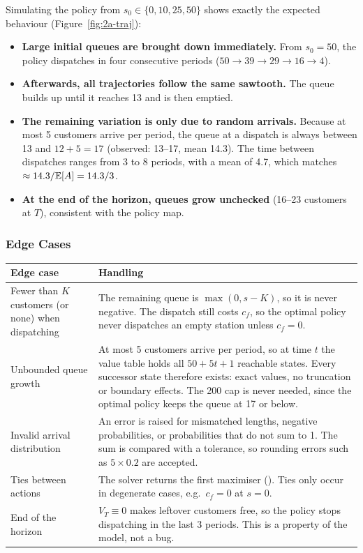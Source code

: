 Simulating the policy from $s_0 \in \{0, 10, 25, 50\}$ shows exactly the expected behaviour (Figure~\ref{fig:2a-traj}):
\begin{itemize}
  \item \textbf{Large initial queues are brought down immediately.} From $s_0 = 50$, the policy dispatches in four consecutive periods ($50 \to 39 \to 29 \to 16 \to 4$).
  \item \textbf{Afterwards, all trajectories follow the same sawtooth.} The queue builds up until it reaches 13 and is then emptied.
  \item \textbf{The remaining variation is only due to random arrivals.} Because at most 5 customers arrive per period, the queue at a dispatch is always between 13 and $12 + 5 = 17$ (observed: 13--17, mean 14.3). The time between dispatches ranges from 3 to 8 periods, with a mean of 4.7, which matches $\approx 14.3 / \mathbb{E}[A] = 14.3 / 3$.
  \item \textbf{At the end of the horizon, queues grow unchecked} (16--23 customers at $T$), consistent with the policy map.
\end{itemize}

\subsubsection{Edge Cases}

\begin{center}
\small
\begin{tabularx}{\textwidth}{@{}p{3.6cm}L@{}}
  \toprule
  \textbf{Edge case} & \textbf{Handling} \\
  \midrule
  Fewer than $K$ customers (or none) when dispatching & The remaining queue is $\max(0, s - K)$, so it is never negative. The dispatch still costs $c_f$, so the optimal policy never dispatches an empty station unless $c_f = 0$. \\
  Unbounded queue growth & At most 5 customers arrive per period, so at time $t$ the value table holds all $50 + 5t + 1$ reachable states. Every successor state therefore exists: exact values, no truncation or boundary effects. The 200 cap is never needed, since the optimal policy keeps the queue at 17 or below. \\
  Invalid arrival distribution & An error is raised for mismatched lengths, negative probabilities, or probabilities that do not sum to 1. The sum is compared with a tolerance, so rounding errors such as $5 \times 0.2$ are accepted. \\
  Ties between actions & The solver returns the first maximiser (). Ties only occur in degenerate cases, e.g.\ $c_f = 0$ at $s = 0$. \\
  End of the horizon & $V_T \equiv 0$ makes leftover customers free, so the policy stops dispatching in the last 3 periods. This is a property of the model, not a bug. \\
  \bottomrule
\end{tabularx}
\end{center}

